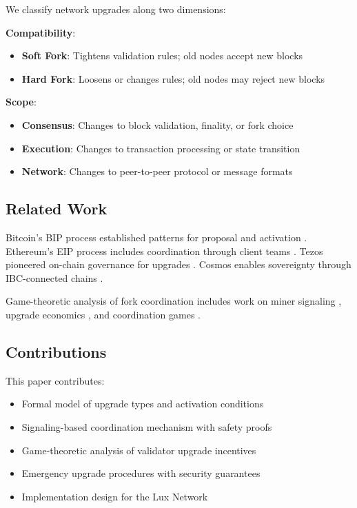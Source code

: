 \documentclass[11pt,a4paper]{article}
\theoremstyle{definition}
\theoremstyle{remark}
\begin{document}
We classify network upgrades along two dimensions:

\textbf{Compatibility}:
\begin{itemize}
    \item \textbf{Soft Fork}: Tightens validation rules; old nodes accept new blocks
    \item \textbf{Hard Fork}: Loosens or changes rules; old nodes may reject new blocks
\end{itemize}

\textbf{Scope}:
\begin{itemize}
    \item \textbf{Consensus}: Changes to block validation, finality, or fork choice
    \item \textbf{Execution}: Changes to transaction processing or state transition
    \item \textbf{Network}: Changes to peer-to-peer protocol or message formats
\end{itemize}

\subsection{Related Work}

Bitcoin's BIP process established patterns for proposal and activation \cite{bip2, bip9}. Ethereum's EIP process includes coordination through client teams \cite{beiko2021eip}. Tezos pioneered on-chain governance for upgrades \cite{goodman2014tezos}. Cosmos enables sovereignty through IBC-connected chains \cite{kwon2019cosmos}.

Game-theoretic analysis of fork coordination includes work on miner signaling \cite{kiayias2016blockchain}, upgrade economics \cite{narayanan2016bitcoin}, and coordination games \cite{morris2002signaling}.

\subsection{Contributions}

This paper contributes:
\begin{itemize}
    \item Formal model of upgrade types and activation conditions
    \item Signaling-based coordination mechanism with safety proofs
    \item Game-theoretic analysis of validator upgrade incentives
    \item Emergency upgrade procedures with security guarantees
    \item Implementation design for the Lux Network
\end{itemize}
\end{document}
